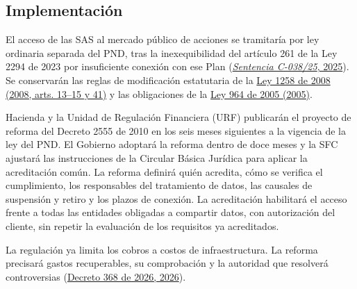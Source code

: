 
\subsection{Implementación}

El acceso de las SAS al mercado público de acciones se tramitaría por ley ordinaria separada del PND, tras la inexequibilidad del artículo 261 de la Ley 2294 de 2023 por insuficiente conexión con ese Plan (\href{https://www.corteconstitucional.gov.co/relatoria/2025/c-038-25.htm}{\textit{Sentencia C-038/25}, 2025}). Se conservarán las reglas de modificación estatutaria de la \href{https://www1.funcionpublica.gov.co/eva/gestornormativo/norma.php?i=34130}{Ley 1258 de 2008 (2008, arts. 13–15 y 41)} y las obligaciones de la \href{https://normativa.colpensiones.gov.co/colpensiones/compilacion/docs/ley\_0964\_2005.htm}{Ley 964 de 2005 (2005)}.

Hacienda y la Unidad de Regulación Financiera (URF) publicarán el proyecto de reforma del Decreto 2555 de 2010 en los seis meses siguientes a la vigencia de la ley del PND. El Gobierno adoptará la reforma dentro de doce meses y la SFC ajustará las instrucciones de la Circular Básica Jurídica para aplicar la acreditación común. La reforma definirá quién acredita, cómo se verifica el cumplimiento, los responsables del tratamiento de datos, las causales de suspensión y retiro y los plazos de conexión. La acreditación habilitará el acceso frente a todas las entidades obligadas a compartir datos, con autorización del cliente, sin repetir la evaluación de los requisitos ya acreditados.

La regulación ya limita los cobros a costos de infraestructura. La reforma precisará gastos recuperables, su comprobación y la autoridad que resolverá controversias (\href{https://normativa.colpensiones.gov.co/compilacion/docs/decreto\_0368\_2026.htm}{Decreto 368 de 2026, 2026}).

